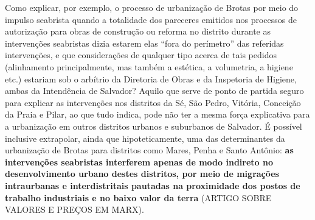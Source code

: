 Como explicar, por exemplo, o processo de urbanização de Brotas por meio do impulso seabrista quando a totalidade dos pareceres emitidos nos processos de autorização para obras de construção ou reforma no distrito durante as intervenções seabristas dizia estarem elas ``fora do perímetro'' das referidas intervenções, e que considerações de qualquer tipo acerca de tais pedidos (alinhamento principalmente, mas também a estética, a volumetria, a higiene etc.) estariam sob o arbítrio da Diretoria de Obras e da Inspetoria de Higiene, ambas da Intendência de Salvador? Aquilo que serve de ponto de partida seguro para explicar as intervenções nos distritos da Sé, São Pedro, Vitória, Conceição da Praia e Pilar, ao que tudo indica, pode não ter a mesma força explicativa para a urbanização em outros distritos urbanos e suburbanos de Salvador. É possível inclusive extrapolar, ainda que hipoteticamente, uma das determinantes da urbanização de Brotas para distritos como Mares, Penha e Santo Antônio: \textbf{as intervenções seabristas interferem apenas de modo indireto no desenvolvimento urbano destes distritos, por meio de migrações intraurbanas e interdistritais pautadas na proximidade dos postos de trabalho industriais e no baixo valor da terra} (ARTIGO SOBRE VALORES E PREÇOS EM MARX).

